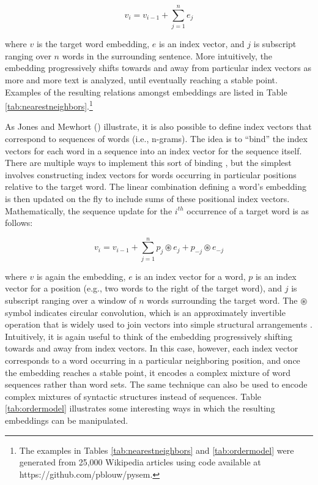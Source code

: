 \begin{equation}
v_{i}=v_{i-1}+ \sum_{j=1}^{n} {e_j}
\end{equation}

\noindent
where $v$ is the target word embedding, $e$ is an index vector, and $j$ is subscript ranging over $n$ words in the surrounding sentence. More intuitively, the embedding progressively shifts towards and away from particular index vectors as more and more text is analyzed, until eventually reaching a stable point. Examples of the resulting relations amongst embeddings are listed in Table \ref{tab:nearestneighbors}.\footnote{The examples in Tables \ref{tab:nearestneighbors} and \ref{tab:ordermodel} were generated from 25,000 Wikipedia articles using code available at https://github.com/pblouw/pysem.}

As Jones and Mewhort (\citeyear{JonesMewhort:2007}) illustrate, it is also possible to define index vectors that correspond to sequences of words (i.e., n-grams). The idea is to ``bind'' the index vectors for each word in a sequence into an index vector for the sequence itself. There are multiple ways to implement this sort of binding \citep[see e.g.,][]{Sahlgren:2008,JonesMewhort:2007,Blouw:2013}, but the simplest involves constructing index vectors for words occurring in particular positions relative to the target word. The linear combination defining a word's embedding is then updated on the fly to include sums of these positional index vectors. Mathematically, the sequence update for the $i^{th}$ occurrence of a target word is as follows:

\begin{equation}
v_{i}=v_{i-1}+ \sum_{j=1}^{n} {p_j \circledast e_{j} + p_{-j} \circledast e_{-j}}
\end{equation}

\noindent
where $v$ is again the embedding, $e$ is an index vector for a word, $p$ is an index vector for a position (e.g., two words to the right of the target word), and $j$ is subscript ranging over a window of $n$ words surrounding the target word. The $ \circledast $ symbol indicates circular convolution, which is an approximately invertible operation that is widely used to join vectors into simple structural arrangements \citep{Plate:2003}. Intuitively, it is again useful to think of the embedding progressively shifting towards and away from index vectors. In this case, however, each index vector corresponds to a word occurring in a particular neighboring position, and once the embedding reaches a stable point, it encodes a complex mixture of word sequences rather than word sets. The same technique can also be used to encode complex mixtures of syntactic structures instead of sequences. Table \ref{tab:ordermodel} illustrates some interesting ways in which the resulting embeddings can be manipulated.

